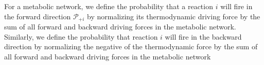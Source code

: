 For a metabolic network, we define the probability that a reaction $i$ will fire in the forward  direction ${\mathcal P_{+i}}$ by normalizing its thermodynamic driving force by the sum of all forward and backward driving forces in the metabolic network. Similarly, we define the probability that reaction $i$ will fire in the backward direction by normalizing the negative of the thermodynamic force by  the sum of all forward and backward driving forces in the metabolic network